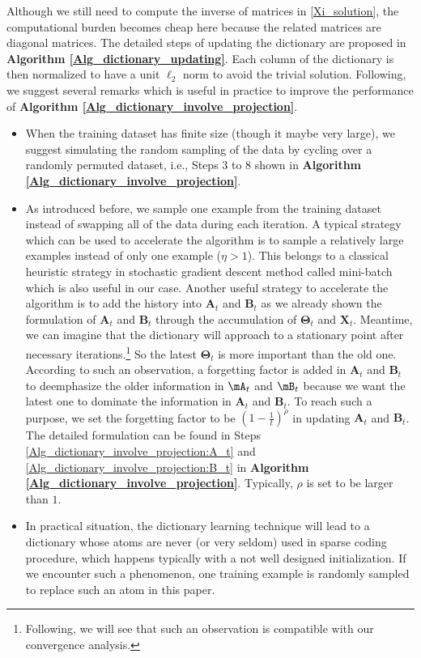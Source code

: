 \documentclass[final,5p,times,twocolumn]{elsarticle}
\begin{document}
\ee
Although we still need to compute the inverse of matrices in \eqref{Xi_solution}, the computational burden becomes cheap here because the related matrices are diagonal matrices.  The detailed steps of updating the dictionary are proposed in {\bf Algorithm \ref{Alg_dictionary_updating}}. Each column of the dictionary is then normalized to have a unit $\ell_2$ norm  to avoid the trivial solution. Following, we suggest several remarks which is useful in practice to improve the performance of {\bf Algorithm \ref{Alg_dictionary_involve_projection}}.

\vspace{-0.25cm}
\begin{itemize}
	\item When the training dataset has finite size (though it maybe very large), we suggest simulating the random sampling of the data by cycling over a randomly permuted dataset, i.e., Steps $3$ to $8$ shown in {\bf Algorithm \ref{Alg_dictionary_involve_projection}}.
	\vspace{-0.25cm}
	\item As introduced before, we sample one example from the training dataset instead of swapping all of the data during each iteration. A typical strategy which can be used to accelerate the algorithm is to sample a relatively large examples instead of only one example ($\eta>1$). This belongs to a classical heuristic strategy in stochastic gradient descent method \cite{LB10} called mini-batch which is also useful in our case. Another useful strategy to accelerate the algorithm is to add the history into $\bm A_t$ and $\bm B_t$ as we already shown the formulation of $\bm A_t$ and $\bm B_t$ through the accumulation of $\bm \Theta_t$ and $\bm X_t$. Meantime, we can imagine that the dictionary will approach to a stationary point after necessary iterations.\footnote{Following, we will see that such an observation is compatible with our convergence analysis.} So the latest $\bm\Theta_t$ is more important than the old one. According to such an observation, a forgetting factor is added in $\bm A_t$ and $\bm B_t$ to deemphasize the older information in $\mA_t$ and $\mB_t$ because we want the latest one to dominate the information in $\bm A_t$ and $\bm B_t$. To reach such a purpose, we set the forgetting factor to be $(1-\frac{1}{t})^\rho$ in updating $\bm A_t$ and $\bm B_t$. The detailed formulation can be found in Steps \ref{Alg_dictionary_involve_projection:A_t} and \ref{Alg_dictionary_involve_projection:B_t} in {\bf Algorithm \ref{Alg_dictionary_involve_projection}}. Typically, $\rho$ is set to be larger than $1$.
	\vspace{-0.25cm}
	\item In practical situation, the dictionary learning technique will lead to a dictionary whose atoms are never (or very seldom) used in sparse coding procedure, which happens typically with a not well designed initialization. If we encounter such a phenomenon, one training example is randomly sampled to replace such an atom in this paper.  	
\end{itemize}
\vspace{-0.25cm}
\end{document}

